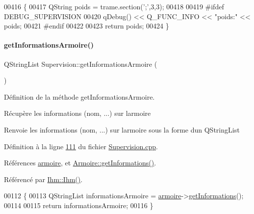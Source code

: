 \begin{DoxyCode}
00416 \{
00417     QString poids = trame.section(\textcolor{charliteral}{';'},3,3);
00418 
00419 \textcolor{preprocessor}{    #ifdef DEBUG\_SUPERVISION}
00420         qDebug() << Q\_FUNC\_INFO << \textcolor{stringliteral}{"poids:"} << poids;
00421 \textcolor{preprocessor}{    #endif}
00422 
00423     \textcolor{keywordflow}{return} poids;
00424 \}
\end{DoxyCode}
\mbox{\label{class_supervision_a72bd93799fcf5423a5f0c5538d4ec892}} 
\paragraph{\texorpdfstring{get\+Informations\+Armoire()}{getInformationsArmoire()}}
{\footnotesize\ttfamily Q\+String\+List Supervision\+::get\+Informations\+Armoire (\begin{DoxyParamCaption}{ }\end{DoxyParamCaption})}



Définition de la méthode get\+Informations\+Armoire. 

Récupère les informations (nom, ...) sur l\textquotesingle{}armoire \begin{DoxyReturn}{Renvoie}
les informations (nom, ...) sur l\textquotesingle{}armoire sous la forme d\textquotesingle{}un Q\+String\+List 
\end{DoxyReturn}


Définition à la ligne \hyperlink{_supervision_8cpp_source_l00111}{111} du fichier \hyperlink{_supervision_8cpp_source}{Supervision.\+cpp}.



Références \hyperlink{_supervision_8h_source_l00084}{armoire}, et \hyperlink{_armoire_8cpp_source_l00078}{Armoire\+::get\+Informations()}.



Référencé par \hyperlink{_ihm_8cpp_source_l00029}{Ihm\+::\+Ihm()}.


\begin{DoxyCode}
00112 \{
00113     QStringList informationsArmoire = \hyperlink{class_supervision_a9f974b5c47899192395e539a0f11034c}{armoire}->\hyperlink{class_armoire_a3e4d2ffc2fb91dd24d1160305ad36555}{getInformations}();
00114 
00115     \textcolor{keywordflow}{return} informationsArmoire;
00116 \}
\end{DoxyCode}
\mbox{\label{class_supervision_af2df200be6727338110b81812703d0ae}} 
